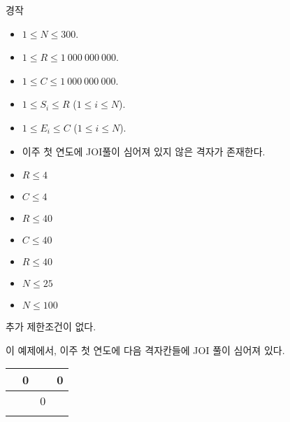 \begin{problem}{경작}
\begin{itemize}
	\item $1 \le N \le 300$.
	\item $1 \le R \le 1\ 000\ 000\ 000$.
	\item $1 \le C \le 1\ 000\ 000\ 000$.
	\item $1 \le S_i \le R$ ($1 \le i \le N$).
	\item $1 \le E_i \le C$ ($1 \le i \le N$).
	\item 이주 첫 연도에 JOI풀이 심어져 있지 않은 격자가 존재한다.		
	\end{itemize}
	
	
	\begin{itemize}
		\item $R \le 4$
		\item $C \le 4$
	\end{itemize}

	\begin{itemize}
		\item $R \le 40$
		\item $C \le 40$
	\end{itemize}

	\begin{itemize}
		\item $R \le 40$
	\end{itemize}

	\begin{itemize}
		\item $N \le 25$
	\end{itemize}


	\begin{itemize}
		\item $N \le 100$
	\end{itemize}
	
	
	
	추가 제한조건이 없다.
	
	\Examples
		
	\begin{example}
	\end{example}

	이 예제에서, 이주 첫 연도에 다음 격자칸들에 JOI 풀이 심어져 있다.
	
	
	\begin{center}
	
		\begin{tabular}{|l|l|l|l|}
			\hline
		\phantom{0}	& 0 &   & 0 \\ \hline
			&   & 0 &   \\ \hline
			&   &   &   \\ \hline
		\end{tabular}
	

\end{center}
\end{problem}
